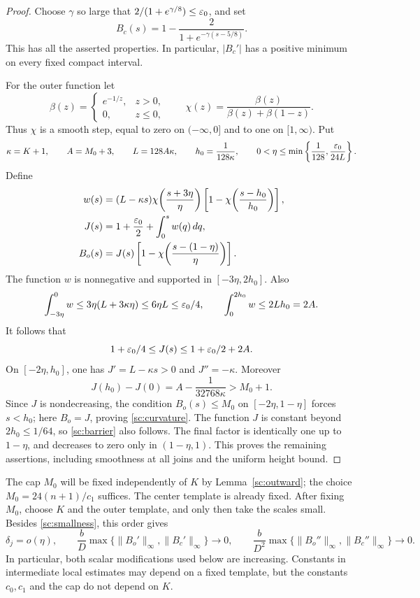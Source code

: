 \begin{proof}
Choose $\gamma$ so large that $2/(1+e^{\gamma/8})\leq\varepsilon_0$, and set
\[
 B_c(s)=1-\frac{2}{1+e^{-\gamma(s-5/8)}}.
\]
This has all the asserted properties.  In particular, $|B_c'|$ has a
positive minimum on every fixed compact interval.

For the outer function let
\[
 \beta(z)=\begin{cases}e^{-1/z},&z>0,\\0,&z\leq0,\end{cases}
 \qquad
 \chi(z)=\frac{\beta(z)}{\beta(z)+\beta(1-z)}.
\]
Thus $\chi$ is a smooth step, equal to zero on $(-\infty,0]$ and to
one on $[1,\infty)$.  Put
\[
 \kappa=K+1,\qquad A=M_0+3,\qquad
 L=128A\kappa,\qquad h_0=\frac1{128\kappa},\qquad
 0<\eta\leq\min\left\{\frac1{128},\frac{\varepsilon_0}{24L}\right\}.
\]
Define
\begin{align*}
 w(s)&=(L-\kappa s)
       \chi\!\left(\frac{s+3\eta}{\eta}\right)
       \left[1-\chi\!\left(\frac{s-h_0}{h_0}\right)\right],\\
 J(s)&=1+\frac{\varepsilon_0}2+\int_0^s w(q)\,dq,\\
 B_o(s)&=J(s)
       \left[1-\chi\!\left(\frac{s-(1-\eta)}{\eta}\right)\right].
\end{align*}
The function $w$ is nonnegative and supported in $[-3\eta,2h_0]$.
Also
\[
 \int_{-3\eta}^0w\leq3\eta(L+3\kappa\eta)
       \leq6\eta L\leq\varepsilon_0/4,\qquad
 \int_0^{2h_0}w\leq2Lh_0=2A.
\]
It follows that
\[
 1+\varepsilon_0/4\leq J(s)\leq1+\varepsilon_0/2+2A.
\]
On $[-2\eta,h_0]$, one has $J'=L-\kappa s>0$ and
$J''=-\kappa$.  Moreover
\[
 J(h_0)-J(0)=A-\frac1{32768\kappa}>M_0+1.
\]
Since $J$ is nondecreasing, the condition $B_o(s)\leq M_0$ on
$[-2\eta,1-\eta]$ forces $s<h_0$; here $B_o=J$, proving
\eqref{sc:curvature}.  The function $J$ is constant beyond
$2h_0\leq1/64$, so \eqref{sc:barrier} also follows.
The final factor is identically one up to $1-\eta$, and decreases to
zero only in $(1-\eta,1)$.  This proves the remaining assertions,
including smoothness at all joins and the uniform height bound.
\end{proof}

The cap $M_0$ will be fixed independently of $K$ by
Lemma~\ref{sc:outward}; the choice
$M_0=24(n+1)/c_1$ suffices.  The center template is already fixed.
After fixing $M_0$, choose $K$ and the outer template, and only then
take the scales small.  Besides \eqref{sc:smallness}, this order gives
\begin{equation}
 \delta_j=o(\eta),\qquad
 \frac bD\max\{\|B_o'\|_\infty,\|B_c'\|_\infty\}\to0,\qquad
 \frac b{D^2}\max\{\|B_o''\|_\infty,\|B_c''\|_\infty\}\to0.
 \label{sc:template-smallness}
\end{equation}
In particular, both scalar modifications used below are increasing.
Constants in intermediate local estimates may depend on a fixed
template, but the constants $c_0,c_1$ and the cap do not depend on $K$.

